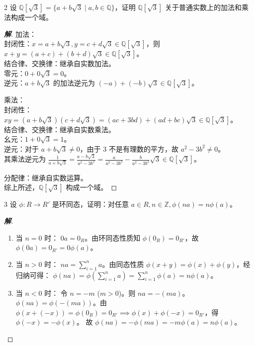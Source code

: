 \documentclass[12pt, a4paper]{article}
\newenvironment{solution}{
    \begin{proof}[\textbf{解}]
}{
    \end{proof}
}
\begin{document}
\begin{problem}{2}
    设 $\mathbb{Q}[\sqrt{3}]=\{a+b\sqrt{3} \mid a,b\in \mathbb{Q}\}$，证明 $\mathbb{Q}[\sqrt{3}]$ 关于普通实数上的加法和乘法构成一个域。
\end{problem}
\begin{solution}
    加法：\\
    封闭性：$x=a+b\sqrt{3}, y=c+d\sqrt{3} \in \mathbb{Q}[\sqrt{3}]$，则 $x+y=(a+c)+(b+d)\sqrt{3} \in \mathbb{Q}[\sqrt{3}]$。\\
    结合律、交换律：继承自实数加法。\\
    零元：$0+0\sqrt{3} = 0$。\\
    逆元：$a+b\sqrt{3}$ 的加法逆元为 $(-a)+(-b)\sqrt{3} \in \mathbb{Q}[\sqrt{3}]$。

    乘法：\\
    封闭性：$xy = (a+b\sqrt{3})(c+d\sqrt{3}) = (ac+3bd)+(ad+bc)\sqrt{3} \in \mathbb{Q}[\sqrt{3}]$。\\
    结合律、交换律：继承自实数乘法。\\
    幺元：$1+0\sqrt{3} = 1$。\\
    逆元：对于 $a+b\sqrt{3} \neq 0$，由于 $3$ 不是有理数的平方，故 $a^2-3b^2 \neq 0$。\\
    其乘法逆元为 $\frac{1}{a+b\sqrt{3}} = \frac{a-b\sqrt{3}}{a^2-3b^2} = \frac{a}{a^2-3b^2} - \frac{b}{a^2-3b^2}\sqrt{3} \in \mathbb{Q}[\sqrt{3}]$。

    分配律：继承自实数运算。\\
    综上所述，$\mathbb{Q}[\sqrt{3}]$ 构成一个域。
\end{solution}


\begin{problem}{3}
    设 $\phi: R \to R'$ 是环同态，证明：对任意 $a \in R, n \in \mathbb{Z}, \phi(na)=n\phi(a)$。
\end{problem}
\begin{solution}
    \begin{enumerate}[1.]
        \item 当 $n=0$ 时：
        $0a = 0_R$。由环同态性质知 $\phi(0_R) = 0_{R'}$，故 $\phi(0a) = 0_{R'} = 0\phi(a)$。

        \item 当 $n > 0$ 时：
        $na = \sum_{i=1}^n a$。由同态性质 $\phi(x+y) = \phi(x) + \phi(y)$，经归纳可得：
        $\phi(na) = \phi(\sum_{i=1}^n a) = \sum_{i=1}^n \phi(a) = n\phi(a)$。

        \item 当 $n < 0$ 时：
        令 $n = -m$ ($m > 0$)。则 $na = - (ma)$。
        $\phi(na) = \phi(-(ma))$。由 $\phi(x+(-x)) = \phi(0_R) = 0_{R'} \implies \phi(x) + \phi(-x) = 0_{R'}$，得 $\phi(-x) = -\phi(x)$。
        故 $\phi(na) = -\phi(ma) = -m\phi(a) = n\phi(a)$。
    \end{enumerate}
\end{solution}
\end{document}
